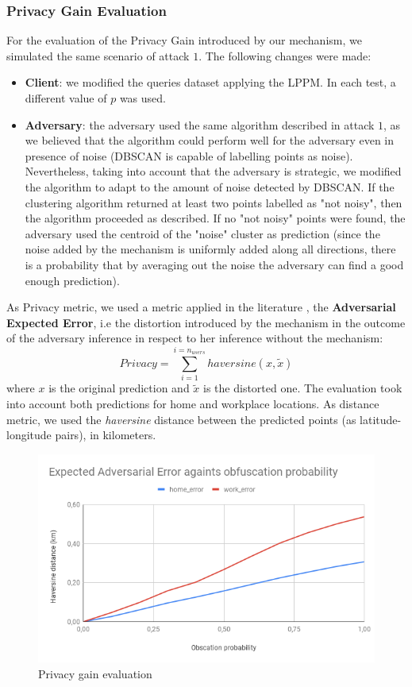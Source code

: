 \documentclass[10pt,conference,compsocconf]{IEEEtran}
\begin{document}
\subsubsection{Privacy Gain Evaluation}
For the evaluation of the Privacy Gain introduced by our mechanism, we simulated
the same scenario of attack $1$. The following changes were made:
\begin{itemize}
    \item \textbf{Client}: we modified the queries dataset applying the LPPM. In
    each test, a different value of $p$ was used.
    \item \textbf{Adversary}: the adversary used the same algorithm described in
    attack $1$, as we believed that the algorithm could perform well for the
    adversary even in presence of noise (DBSCAN is capable of labelling points
    as noise). Nevertheless, taking into account that the adversary is
    strategic, we modified the algorithm to adapt to the amount of noise
    detected by DBSCAN. If the clustering algorithm returned at least two points
    labelled as "not noisy", then the algorithm proceeded as described. If no
    "not noisy" points were found, the adversary used the centroid of the
    "noise" cluster as prediction (since the noise added by the mechanism is
    uniformly added along all directions, there is a probability that by
    averaging out the noise the adversary can find a good enough prediction).
\end{itemize}
As Privacy metric, we used a metric applied in the literature \cite{Shokri}, the
\textbf{Adversarial Expected Error}, i.e the distortion introduced by the
mechanism in the outcome of the adversary inference in respect to her inference
without the mechanism:
\[Privacy = \sum_{i=1}^{i=n_{users}}haversine(x, \tilde{x})\] where $x$ is the
original prediction and $\tilde{x}$ is the distorted one. The evaluation took
into account both predictions for home and workplace locations. As distance
metric, we used the \textit{haversine} distance between the predicted points (as
latitude-longitude pairs), in kilometers.
    \begin{figure}[h!]
        \centering  
        \includegraphics[width=0.9\linewidth]{../privacy_evaluation/adv_error.png}
        \caption{Privacy gain evaluation}
    \end{figure}
\end{document}
